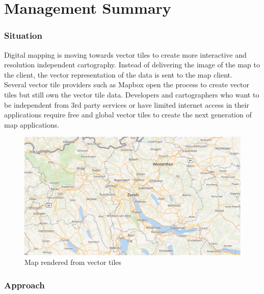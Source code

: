 
\begingroup
\let\clearpage\relax
\let\cleardoublepage\relax
\let\cleardoublepage\relax

\chapter*{Management Summary}
\label{management-summary}

\subsection*{Situation}\label{introduction}

Digital mapping is moving towards vector tiles to create more interactive and resolution independent cartography. Instead of delivering the image of the map to the client, the vector representation of the data is sent to the map client.\\

Several vector tile providers such as Mapbox open the process to create vector tiles but still own the vector tile data. Developers and cartographers who want to be independent from 3rd party services or have limited internet access in their applications require free and global vector tiles to create the next generation of map applications.

\begin{figure}[H]
\centering
\includegraphics[width=\textwidth]{images/osm_bright}
\caption*{Map rendered from \osmvt{} vector tiles}
\end{figure}

\subsection*{Approach}

